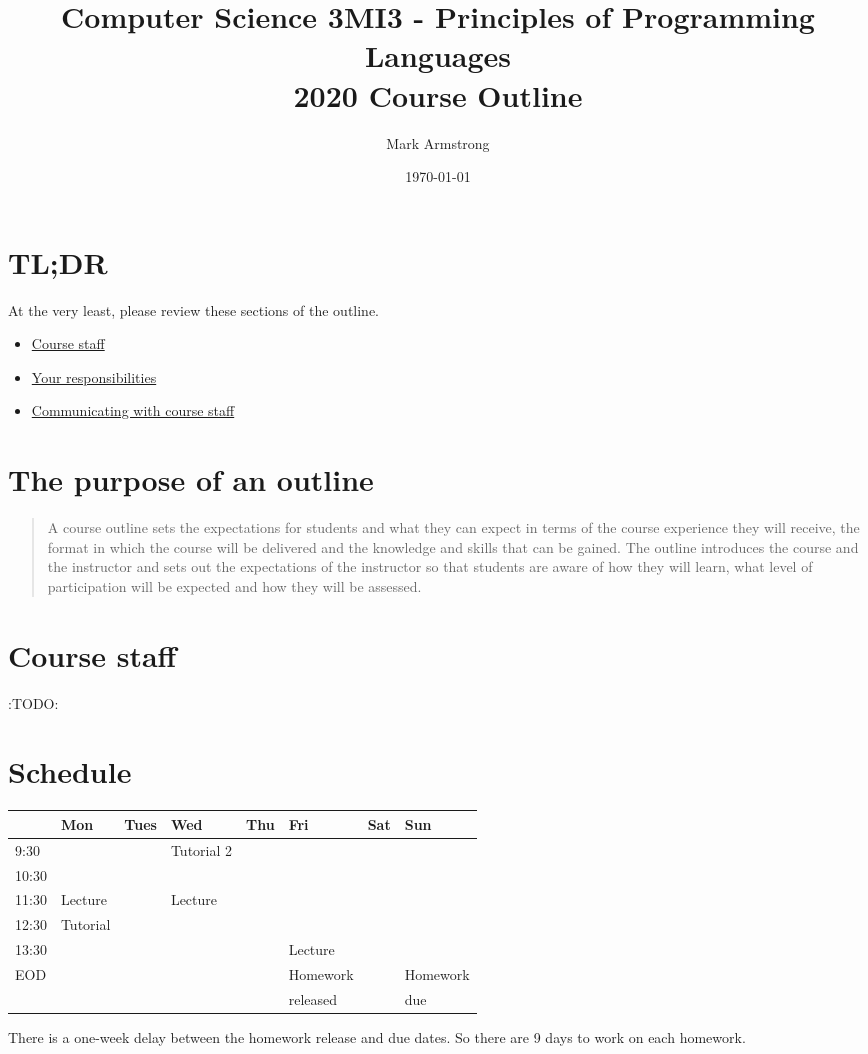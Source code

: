 \documentclass[11pt]{article}
\author{Mark Armstrong}
\date{\today}
\title{Computer Science 3MI3 - Principles of Programming Languages\\\medskip
\large 2020 Course Outline}
\begin{document}
\maketitle
\tableofcontents


\section{TL;DR}
\label{sec:orga771436}
At the very least, please review these sections of the outline.
\begin{itemize}
\item \hyperref[sec:orgf33f233]{Course staff}
\item \hyperref[sec:org3d4e80d]{Your responsibilities}
\item \hyperref[sec:org2f62aa5]{Communicating with course staff}
\end{itemize}

\section{The purpose of an outline}
\label{sec:orgc52b3fa}
\begin{quote}
A course outline sets the expectations for students
and what they can expect in terms of the course
experience they will receive,
the format in which the course will be delivered
and the knowledge and skills that can be gained.
The outline introduces the course and the instructor
and sets out the expectations of the instructor
so that students are aware of how they will learn,
what level of participation will be expected
and how they will be assessed.
\end{quote}

\section{Course staff}
\label{sec:orgf33f233}
:TODO:

\section{Schedule}
\label{sec:org0aafd14}
\begin{center}
\begin{tabular}{|l|l|l|l|l|l|l|l|}
\hline
 & Mon & Tues & Wed & Thu & Fri & Sat & Sun \\
\hline
9:30 & & & Tutorial 2 & & & & \\
\hline
10:30 & & & & & & & \\
\hline
11:30 & Lecture & & Lecture & & & & \\
\hline
12:30 & Tutorial & & & & & & \\
\hline
13:30 & & & & & Lecture & & \\
\hline
EOD & & & & & Homework & & Homework \\
 & & & & & released & & due \\
\hline
\end{tabular}
\end{center}
There is a one-week delay between the homework release and due dates.
So there are 9 days to work on each homework.
\end{document}
